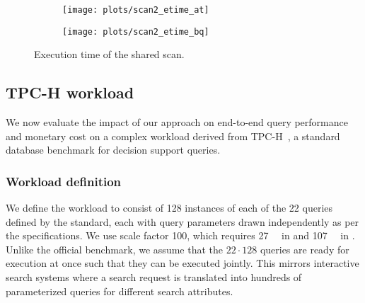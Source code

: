 \begin{figure*}[ht]
    \centering
    \begin{subfigure}{.5\textwidth}
      \centering
      \texttt{[image: plots/scan2\_etime\_at]}
      \caption{\athena}
      \label{fig:exp:sscans:exp2:at}
    \end{subfigure}%
    \begin{subfigure}{.5\textwidth}
      \centering
      \texttt{[image: plots/scan2\_etime\_bq]}
      \caption{\bigquery}
      \label{fig:exp:sscans:exp2:bq}
    \end{subfigure}
    \caption{Execution time of the shared scan.}
    \label{fig:exp:sscans:exp2:sel}
\end{figure*}


\subsection{TPC-H workload}
\label{sec:exp:tpch}

We now evaluate the impact of our approach
on end-to-end query performance and monetary cost
on a complex workload derived from TPC-H~\cite{TPCH2018},
a standard database benchmark for decision support queries.


\subsubsection{Workload definition}

We define the workload to consist of 128 instances
of each of the 22 queries defined by the standard,
each with query parameters drawn independently as per the specifications.
We use scale factor 100, which requires \SI{27}{\gibi\byte} in \athena
and \SI{107}{\gibi\byte} in \bigquery.
Unlike the official benchmark, we assume that
the $22 \cdot 128$ queries are ready for execution at once
such that they can be executed jointly.
This mirrors interactive search systems where a search request is translated
into hundreds of parameterized queries for different search attributes.


